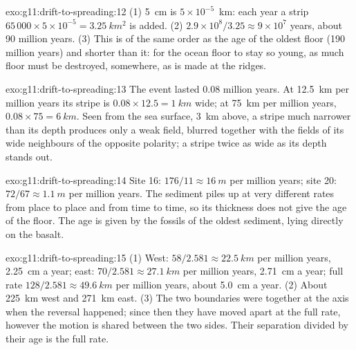 \begin{solution}{exo:g11:drift-to-spreading:12}
(1) \qty{5}{cm} is $5 \times 10^{-5}$~\unit{km}: each year a strip
$65\,000 \times 5 \times 10^{-5} = \qty{3.25}{km^2}$ is added.
(2) $2.9 \times 10^8/3.25 \approx 9 \times 10^7$ years, about 90 million
years. (3) This is of the same order as the age of the oldest floor
(190 million years) and shorter than it: for the ocean floor to stay so
young, as much floor must be destroyed, somewhere, as is made at the ridges.
\end{solution}

\begin{solution}{exo:g11:drift-to-spreading:13}
The event lasted \num{0.08} million years. At \qty{12.5}{km} per million years
its stripe is $0.08 \times 12.5 = \qty{1}{km}$ wide; at \qty{75}{km} per
million years, $0.08 \times 75 = \qty{6}{km}$. Seen from the sea surface,
\qty{3}{km} above, a stripe much narrower than its depth produces only a weak
field, blurred together with the fields of its wide neighbours of the opposite
polarity; a stripe twice as wide as its depth stands out.
\end{solution}

\begin{solution}{exo:g11:drift-to-spreading:14}
Site 16: $176/11 \approx \qty{16}{m}$ per million years; site 20: $72/67
\approx \qty{1.1}{m}$ per million years. The sediment piles up at very
different rates from place to place and from time to time, so its thickness
does not give the age of the floor. The age is given by the fossils of the
oldest sediment, lying directly on the basalt.
\end{solution}

\begin{solution}{exo:g11:drift-to-spreading:15}
(1) West: $58/2.581 \approx \qty{22.5}{km}$ per million years,
\qty{2.25}{cm} a year; east: $70/2.581 \approx \qty{27.1}{km}$ per million
years, \qty{2.71}{cm} a year; full rate $128/2.581 \approx \qty{49.6}{km}$ per
million years, about \qty{5.0}{cm} a year. (2) About \qty{225}{km} west and
\qty{271}{km} east. (3) The two boundaries were together at the axis when the
reversal happened; since then they have moved apart at the full rate, however
the motion is shared between the two sides. Their separation divided by
their age is the full rate.
\end{solution}

